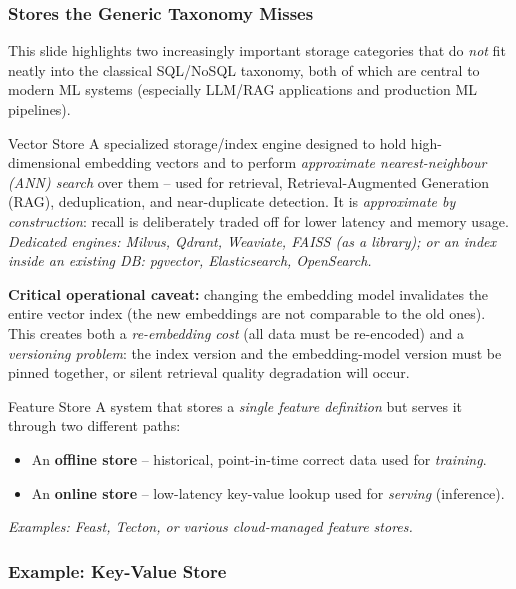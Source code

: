 \subsubsection{Stores the Generic Taxonomy Misses}

This slide highlights two increasingly important storage categories that do \emph{not} fit neatly into the classical SQL/NoSQL taxonomy, both of which are central to modern ML systems (especially LLM/RAG applications and production ML pipelines).

\begin{defbox}{Vector Store}
A specialized storage/index engine designed to hold high-dimensional embedding vectors and to perform \emph{approximate nearest-neighbour (ANN) search} over them -- used for retrieval, Retrieval-Augmented Generation (RAG), deduplication, and near-duplicate detection. It is \emph{approximate by construction}: recall is deliberately traded off for lower latency and memory usage. \emph{Dedicated engines: Milvus, Qdrant, Weaviate, FAISS (as a library); or an index inside an existing DB: pgvector, Elasticsearch, OpenSearch.}
\end{defbox}

\textbf{Critical operational caveat:} changing the embedding model invalidates the entire vector index (the new embeddings are not comparable to the old ones). This creates both a \emph{re-embedding cost} (all data must be re-encoded) and a \emph{versioning problem}: the index version and the embedding-model version must be pinned together, or silent retrieval quality degradation will occur.

\begin{defbox}{Feature Store}
A system that stores a \emph{single feature definition} but serves it through two different paths:
\begin{itemize}
    \item An \textbf{offline store} -- historical, point-in-time correct data used for \emph{training}.
    \item An \textbf{online store} -- low-latency key-value lookup used for \emph{serving} (inference).
\end{itemize}

\end{defbox}

\emph{Examples: Feast, Tecton, or various cloud-managed feature stores.}



\subsubsection{Example: Key-Value Store}

